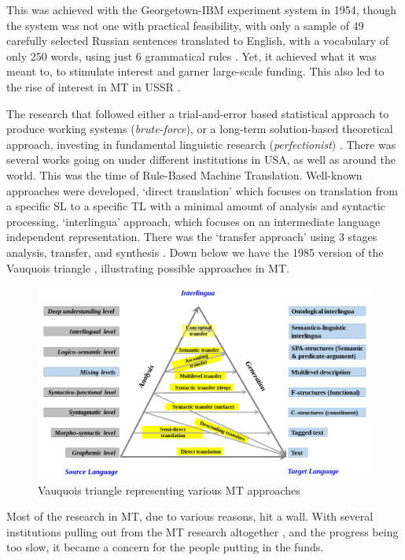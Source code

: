 This was achieved with the Georgetown-IBM \cite{hutchins2004georgetown} experiment system in 1954, though the system was not one with practical feasibility, with only a sample of 49 carefully selected Russian sentences translated to English, with a vocabulary of only 250 words, using just 6 grammatical rules \cite{hutchins1995machine}. Yet, it achieved what it was meant to, to stimulate interest and garner large-scale funding. This also led to the rise of interest in MT in USSR \cite{hutchins1995machine}.

The research that followed either a trial-and-error based statistical approach to produce working systems (\textit{brute-force}), or a long-term solution-based theoretical approach, investing in fundamental linguistic research (\textit{perfectionist}) \cite{hutchins1995machine}. There was several works going on under different institutions in USA, as well as around the world. This was the time of Rule-Based Machine Translation. Well-known approaches were developed, `direct translation' which focuses on translation from a specific SL to a specific TL with a minimal amount of analysis and syntactic processing, `interlingua' approach, which focuses on an intermediate language independent representation. There was the `transfer approach' using 3 stages analysis, transfer, and synthesis \cite{hutchins2023machine}. Down below we have the 1985 version of the Vauquois triangle \cite{vauquois1968survey}, illustrating possible approaches in MT.

\begin{figure}[h]
    \centering
    \includegraphics[width=\textwidth]{images/VauquoisModel.png}
    \caption{Vauquois triangle representing various MT approaches}
\end{figure}

Most of the research in MT, due to various reasons, hit a wall. With several institutions pulling out from the MT research altogether \cite{hutchins2023machine}, and the progress being too slow, it became a concern for the people putting in the funds.

